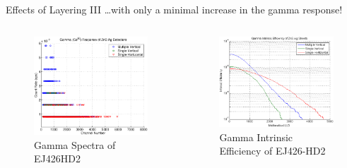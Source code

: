 \begin{frame}{Effects of Layering III}
\dots with only a minimal increase in the gamma response!
\begin{columns}[onlytextwidth]
\begin{column}{0.45\textwidth}
	\tiny
	\begin{figure}
		\centering
		\includegraphics[width=\textwidth]{images/EJ426HD_Multi_GammaComparison.eps}
		\caption{Gamma Spectra of EJ426HD2}
	\end{figure}
\end{column}
\begin{column}{0.45\textwidth}
	\tiny
	\begin{figure}
		\centering
		\includegraphics[width=\textwidth]{images/EJ426HD_Multi_GammaIntEff.eps}
		\caption{Gamma Intrinsic Efficiency of EJ426-HD2}
\end{figure}
\end{column}
\end{columns}
\end{frame}
